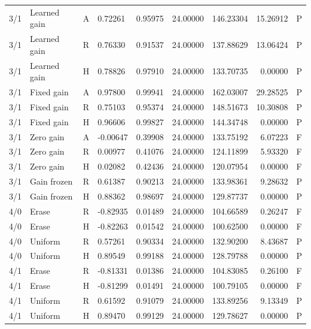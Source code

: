 \begin{longtable}{rlllrrrrl}
3/1 & Learned gain & A & 0.72261 & 0.95975 & 24.00000 & 146.23304 & 15.26912 & P \\
3/1 & Learned gain & R & 0.76330 & 0.91537 & 24.00000 & 137.88629 & 13.06424 & P \\
3/1 & Learned gain & H & 0.78826 & 0.97910 & 24.00000 & 133.70735 & 0.00000 & P \\
3/1 & Fixed gain & A & 0.97800 & 0.99941 & 24.00000 & 162.03007 & 29.28525 & P \\
3/1 & Fixed gain & R & 0.75103 & 0.95374 & 24.00000 & 148.51673 & 10.30808 & P \\
3/1 & Fixed gain & H & 0.96606 & 0.99827 & 24.00000 & 144.34748 & 0.00000 & P \\
3/1 & Zero gain & A & -0.00647 & 0.39908 & 24.00000 & 133.75192 & 6.07223 & F \\
3/1 & Zero gain & R & 0.00977 & 0.41076 & 24.00000 & 124.11899 & 5.93320 & F \\
3/1 & Zero gain & H & 0.02082 & 0.42436 & 24.00000 & 120.07954 & 0.00000 & F \\
3/1 & Gain frozen & R & 0.61387 & 0.90213 & 24.00000 & 133.98361 & 9.28632 & P \\
3/1 & Gain frozen & H & 0.88362 & 0.98697 & 24.00000 & 129.87737 & 0.00000 & P \\
4/0 & Erase & R & -0.82935 & 0.01489 & 24.00000 & 104.66589 & 0.26247 & F \\
4/0 & Erase & H & -0.82263 & 0.01542 & 24.00000 & 100.62500 & 0.00000 & F \\
4/0 & Uniform & R & 0.57261 & 0.90334 & 24.00000 & 132.90200 & 8.43687 & P \\
4/0 & Uniform & H & 0.89549 & 0.99188 & 24.00000 & 128.79788 & 0.00000 & P \\
4/1 & Erase & R & -0.81331 & 0.01386 & 24.00000 & 104.83085 & 0.26100 & F \\
4/1 & Erase & H & -0.81299 & 0.01491 & 24.00000 & 100.79105 & 0.00000 & F \\
4/1 & Uniform & R & 0.61592 & 0.91079 & 24.00000 & 133.89256 & 9.13349 & P \\
4/1 & Uniform & H & 0.89470 & 0.99129 & 24.00000 & 129.78627 & 0.00000 & P \\
\bottomrule
\end{longtable}

